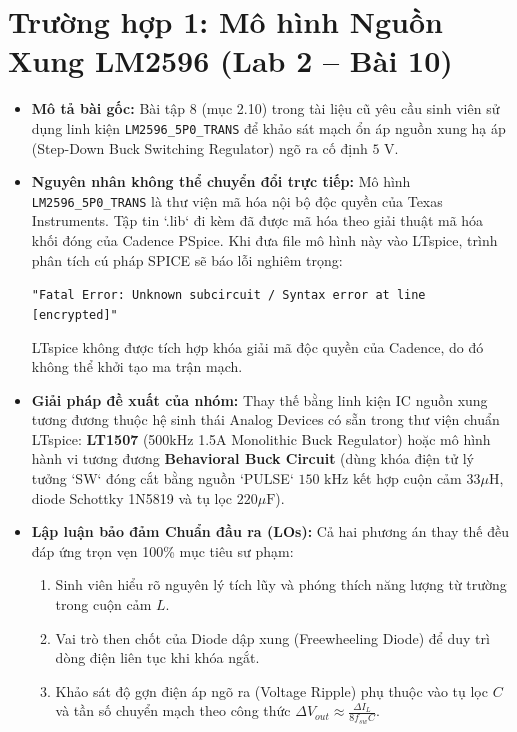 \documentclass[12pt,a4paper]{report}
\begin{document}
\section{Trường hợp 1: Mô hình Nguồn Xung LM2596 (Lab 2 -- Bài 10)}
\begin{itemize}
    \item \textbf{Mô tả bài gốc:} Bài tập 8 (mục 2.10) trong tài liệu cũ yêu cầu sinh viên sử dụng linh kiện \texttt{LM2596\_5P0\_TRANS} để khảo sát mạch ổn áp nguồn xung hạ áp (Step-Down Buck Switching Regulator) ngõ ra cố định $5\text{ V}$.
    \item \textbf{Nguyên nhân không thể chuyển đổi trực tiếp:} Mô hình \texttt{LM2596\_5P0\_TRANS} là thư viện mã hóa nội bộ độc quyền của Texas Instruments. Tập tin `.lib` đi kèm đã được mã hóa theo giải thuật mã hóa khối đóng của Cadence PSpice. Khi đưa file mô hình này vào LTspice, trình phân tích cú pháp SPICE sẽ báo lỗi nghiêm trọng:
    \begin{center}
        \texttt{"Fatal Error: Unknown subcircuit / Syntax error at line [encrypted]"}
    \end{center}
    LTspice không được tích hợp khóa giải mã độc quyền của Cadence, do đó không thể khởi tạo ma trận mạch.
    \item \textbf{Giải pháp đề xuất của nhóm:} Thay thế bằng linh kiện IC nguồn xung tương đương thuộc hệ sinh thái Analog Devices có sẵn trong thư viện chuẩn LTspice: \textbf{LT1507} (500kHz 1.5A Monolithic Buck Regulator) hoặc mô hình hành vi tương đương \textbf{Behavioral Buck Circuit} (dùng khóa điện tử lý tưởng `SW` đóng cắt bằng nguồn `PULSE` $150\text{ kHz}$ kết hợp cuộn cảm $33\mu\text{H}$, diode Schottky 1N5819 và tụ lọc $220\mu\text{F}$).
    \item \textbf{Lập luận bảo đảm Chuẩn đầu ra (LOs):} Cả hai phương án thay thế đều đáp ứng trọn vẹn 100\% mục tiêu sư phạm:
    \begin{enumerate}
        \item Sinh viên hiểu rõ nguyên lý tích lũy và phóng thích năng lượng từ trường trong cuộn cảm $L$.
        \item Vai trò then chốt của Diode dập xung (Freewheeling Diode) để duy trì dòng điện liên tục khi khóa ngắt.
        \item Khảo sát độ gợn điện áp ngõ ra (Voltage Ripple) phụ thuộc vào tụ lọc $C$ và tần số chuyển mạch theo công thức $\Delta V_{out} \approx \frac{\Delta I_L}{8 f_{sw} C}$.
    \end{enumerate}
\end{itemize}
\end{document}
